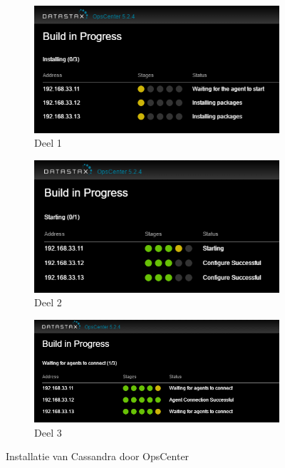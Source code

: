 \begin{figure}[H]
	\centering
	\begin{subfigure}{.49\textwidth}
  		\centering
  		\includegraphics[width=.9\linewidth]{img/4_1_installatie_cassandra/1_Configuration_part_4}
  		\caption{Deel 1}
	\end{subfigure}
	\begin{subfigure}{.49\textwidth}
  		\centering
  		\includegraphics[width=.9\linewidth]{img/4_1_installatie_cassandra/1_Configuration_part_5}
  		\caption{Deel 2}
	\end{subfigure}
	\begin{subfigure}{.49\textwidth}
  		\centering
  		\includegraphics[width=.9\linewidth]{img/4_1_installatie_cassandra/1_Configuration_part_6}
  		\caption{Deel 3}
	\end{subfigure}
	\caption{Installatie van Cassandra door OpsCenter}
	\label{fig:cas_install}
\end{figure}

